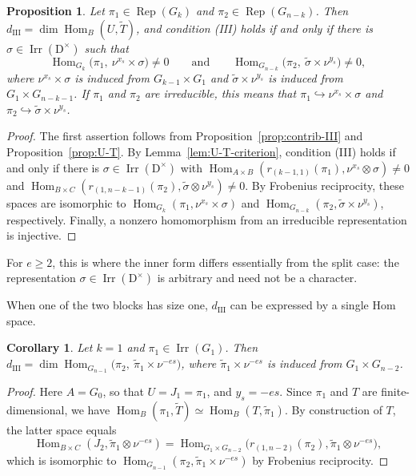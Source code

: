 \documentclass[11pt]{amsart}
\numberwithin{equation}{section}
\theoremstyle{plain}
\newtheorem{proposition}[theorem]{Proposition}
\newtheorem{corollary}[theorem]{Corollary}
\theoremstyle{definition}
\theoremstyle{remark}
\DeclareMathOperator{\Hom}{Hom}
\DeclareMathOperator{\Irr}{Irr}
\DeclareMathOperator{\Rep}{Rep}
\newcommand{\dIII}{d_{\mathrm{III}}}
\begin{document}
\begin{proposition}\label{prop:open-condition}
	Let $\pi_1\in\Rep(G_k)$ and $\pi_2\in\Rep(G_{n-k})$. Then $\dIII=\dim\Hom_B(U,\widetilde T)$, and condition \textup{(III)} holds if and only if there is $\sigma\in\Irr(\mathrm{D}^\times)$ such that
	$$
	\Hom_{G_k}\big(\pi_1,\ \nu^{x_s}\times\sigma\big)\ne0\qquad\text{and}\qquad\Hom_{G_{n-k}}\big(\pi_2,\ \widetilde\sigma\times\nu^{y_s}\big)\ne0,
	$$
	where $\nu^{x_s}\times\sigma$ is induced from $G_{k-1}\times G_1$ and $\widetilde\sigma\times\nu^{y_s}$ is induced from $G_1\times G_{n-k-1}$. If $\pi_1$ and $\pi_2$ are irreducible, this means that $\pi_1\hookrightarrow\nu^{x_s}\times\sigma$ and $\pi_2\hookrightarrow\widetilde\sigma\times\nu^{y_s}$.
\end{proposition}

\begin{proof}
	The first assertion follows from Proposition~\ref{prop:contrib-III} and Proposition~\ref{prop:U-T}. By Lemma~\ref{lem:U-T-criterion}, condition (III) holds if and only if there is $\sigma\in\Irr(\mathrm{D}^\times)$ with $\Hom_{A\times B}(r_{(k-1,1)}(\pi_1),\nu^{x_s}\otimes\sigma)\ne0$ and $\Hom_{B\times C}(r_{(1,n-k-1)}(\pi_2),\widetilde\sigma\otimes\nu^{y_s})\ne0$. By Frobenius reciprocity, these spaces are isomorphic to $\Hom_{G_k}(\pi_1,\nu^{x_s}\times\sigma)$ and $\Hom_{G_{n-k}}(\pi_2,\widetilde\sigma\times\nu^{y_s})$, respectively. Finally, a nonzero homomorphism from an irreducible representation is injective.
\end{proof}

For $e\ge2$, this is where the inner form differs essentially from the split case: the representation $\sigma\in\Irr(\mathrm{D}^\times)$ is arbitrary and need not be a character.

When one of the two blocks has size one, $\dIII$ can be expressed by a single Hom space.

\begin{corollary}\label{cor:dIII-k1}
	Let $k=1$ and $\pi_1\in\Irr(G_1)$. Then $\dIII=\dim\Hom_{G_{n-1}}\big(\pi_2,\ \widetilde\pi_1\times\nu^{-es}\big)$, where $\widetilde\pi_1\times\nu^{-es}$ is induced from $G_1\times G_{n-2}$.
\end{corollary}

\begin{proof}
	Here $A=G_0$, so that $U=J_1=\pi_1$, and $y_s=-es$. Since $\pi_1$ and $T$ are finite-dimensional, we have $\Hom_B(\pi_1,\widetilde T)\simeq\Hom_B(T,\widetilde\pi_1)$. By construction of $T$, the latter space equals
	$$
	\Hom_{B\times C}(J_2,\widetilde\pi_1\otimes\nu^{-es})=\Hom_{G_1\times G_{n-2}}\big(r_{(1,n-2)}(\pi_2),\widetilde\pi_1\otimes\nu^{-es}\big),
	$$
	which is isomorphic to $\Hom_{G_{n-1}}(\pi_2,\widetilde\pi_1\times\nu^{-es})$ by Frobenius reciprocity.
\end{proof}
\end{document}
